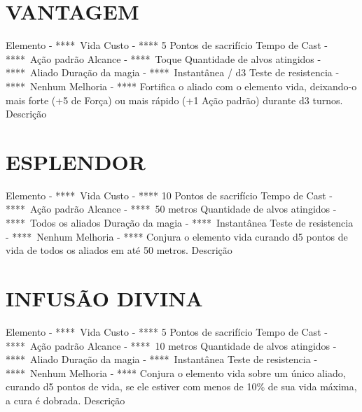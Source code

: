 \documentclass{article}%
\begin{document}
%
\section{VANTAGEM}%
\label{sec:VANTAGEM}%
Elemento {-} ****~Vida\newline%
Custo {-} **** 5 Pontos de sacrifício\newline%
Tempo de Cast {-} ****~Ação padrão\newline%
Alcance {-} ****~Toque\newline%
Quantidade de alvos atingidos {-} ****~Aliado\newline%
Duração da magia {-} ****~Instantânea / d3\newline%
Teste de resistencia {-} ****~Nenhum\newline%
Melhoria {-} **** Fortifica o aliado com o elemento vida, deixando{-}o mais forte (+5 de Força) ou mais rápido (+1 Ação padrão) durante d3 turnos.\newline%
Descrição \newline%

%
\section{ESPLENDOR}%
\label{sec:ESPLENDOR}%
Elemento {-} ****~Vida\newline%
Custo {-} **** 10 Pontos de sacrifício\newline%
Tempo de Cast {-} ****~Ação padrão\newline%
Alcance {-} ****~50 metros\newline%
Quantidade de alvos atingidos {-} ****~Todos os aliados\newline%
Duração da magia {-} ****~Instantânea\newline%
Teste de resistencia {-} ****~Nenhum\newline%
Melhoria {-} **** Conjura o elemento vida curando d5 pontos de vida de todos os aliados em até 50 metros.\newline%
Descrição \newline%

%
\section{INFUSÃO DIVINA}%
\label{sec:INFUSODIVINA}%
Elemento {-} ****~Vida\newline%
Custo {-} **** 5 Pontos de sacrifício\newline%
Tempo de Cast {-} ****~Ação padrão\newline%
Alcance {-} ****~10 metros\newline%
Quantidade de alvos atingidos {-} ****~Aliado\newline%
Duração da magia {-} ****~Instantânea\newline%
Teste de resistencia {-} ****~Nenhum\newline%
Melhoria {-} **** Conjura o elemento vida sobre um único aliado, curando d5 pontos de vida, se ele estiver com menos de 10\% de sua vida máxima, a cura é dobrada.\newline%
Descrição \newline%
\end{document}
